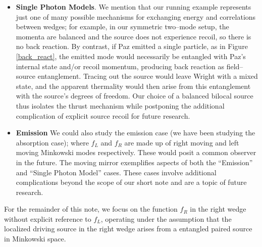 \documentclass[12pt,a4paper]{article}
\begin{document}
{\begin{itemize}
\item {\bf Single Photon Models}. We mention that our running example represents just one of many possible mechanisms for exchanging energy and correlations between wedges; for example, in our symmetric two–mode setup, the momenta are balanced and the source does not experience recoil, so there is no back reaction. By contrast, if Paz emitted a single particle, as in Figure \ref{back_react}, the emitted mode would necessarily be entangled with Paz’s internal state and/or recoil momentum, producing back reaction as field–source entanglement. Tracing out the source would leave Wright with a mixed state, and the apparent thermality would then arise from this entanglement with the source’s degrees of freedom. Our choice of a balanced bilocal source thus isolates the thrust mechanism while postponing the additional complication of explicit source recoil for future research.

\item {\bf Emission} We could also study the emission case (we have been studying the absorption case); where $f_L$ and $f_R$ are made up of right moving and left moving Minkowski modes respectively.  These would posit a common observer in the future. The moving mirror exemplifies aspects of both the ``Emission'' and ``Single Photon Model'' cases. These cases involve additional complications beyond the scope of our short note and are a topic of future research.
\end{itemize}

For the remainder of this note, we focus on the function $f_R$ in the right wedge without explicit reference to $f_L$, operating under the assumption that the localized driving source in the right wedge arises from a entangled paired source in Minkowski space.

}
\end{document}
